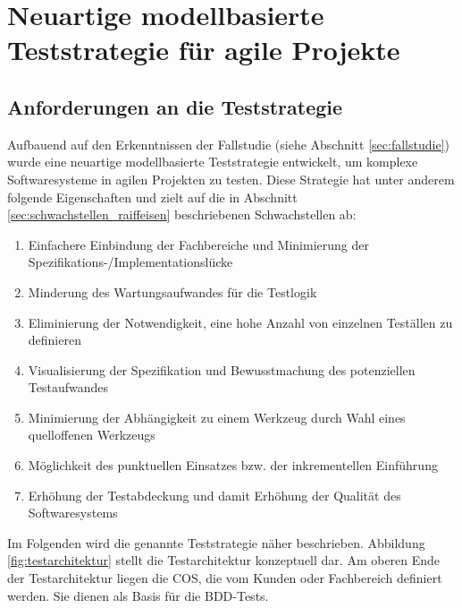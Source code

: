 \chapter{Neuartige modellbasierte Teststrategie für agile Projekte}
\label{sec:results}
\section{Anforderungen an die Teststrategie}
\label{sec:anforderungen_teststrategie}
Aufbauend auf den Erkenntnissen der Fallstudie (siehe Abschnitt \ref{sec:fallstudie}) wurde eine neuartige modellbasierte Teststrategie entwickelt, um komplexe Softwaresysteme in agilen Projekten zu testen. Diese Strategie hat unter anderem folgende Eigenschaften und zielt auf die in Abschnitt \ref{sec:schwachstellen_raiffeisen} beschriebenen Schwachstellen ab:

\begin{enumerate}
\item Einfachere Einbindung der Fachbereiche und Minimierung der Spezifikations-/Implementationslücke
\item Minderung des Wartungsaufwandes für die Testlogik
\item Eliminierung der Notwendigkeit, eine hohe Anzahl von einzelnen Teställen zu definieren
\item Visualisierung der Spezifikation und Bewusstmachung des potenziellen Testaufwandes
\item Minimierung der Abhängigkeit zu einem Werkzeug durch Wahl eines quelloffenen Werkzeugs
\item Möglichkeit des punktuellen Einsatzes bzw. der inkrementellen Einführung
\item Erhöhung der Testabdeckung und damit Erhöhung der Qualität des Softwaresystems
\end{enumerate}

Im Folgenden wird die genannte Teststrategie näher beschrieben. Abbildung \ref{fig:testarchitektur} stellt die Testarchitektur konzeptuell dar. Am oberen Ende der Testarchitektur liegen die \gls{COS}, die vom Kunden oder Fachbereich definiert werden. Sie dienen als Basis für die BDD-Tests. 

